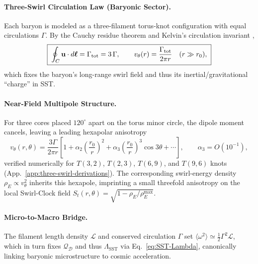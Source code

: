 \documentclass[10pt,reprint,aps,onecolumn,nofootinbib]{revtex4-2}
\begin{document}
    \paragraph{Three-Swirl Circulation Law (Baryonic Sector).}
        Each baryon is modeled as a three-filament torus-knot configuration with
        equal circulations $\Gamma$. By the Cauchy residue theorem and Kelvin’s circulation
        invariant \cite{Kelvin1869,Batchelor1967,Saffman1992},
        \begin{equation}
        \boxed{\;
        \oint_{C} \mathbf{u}\cdot d\boldsymbol{\ell} =
            \Gamma_{\rm tot} = 3\,\Gamma,
            \qquad
            v_\theta(r)=\frac{\Gamma_{\rm tot}}{2\pi r}\quad(r\gg r_0),
            \;}
        \label{eq:three-swirl-circulation}
        \end{equation}
        which fixes the baryon’s long-range swirl field and thus its inertial/gravitational
        ``charge'' in SST.

    \paragraph{Near-Field Multipole Structure.}
        For three cores placed $120^\circ$ apart on the torus minor circle, the dipole
        moment cancels, leaving a leading hexapolar anisotropy
        \begin{equation}
        \boxed{\;
        v_\theta(r,\theta)=\frac{3\Gamma}{2\pi r}\!\left[
                                                       1+\alpha_2\!\left(\frac{r_0}{r}\right)^{2}
                                                       +\alpha_3\!\left(\frac{r_0}{r}\right)^{3}\cos 3\theta+\cdots
        \right],
            \qquad
            \alpha_3=O(10^{-1}),
            \;}
        \label{eq:hexapole-expansion}
        \end{equation}
        verified numerically for $T(3,2)$, $T(2,3)$, $T(6,9)$, and $T(9,6)$ knots
        (App.~\ref{app:three-swirl-derivations}).
        The corresponding swirl-energy density $\rho_{\!E}\propto v_\theta^2$ inherits this
        hexapole, imprinting a small threefold anisotropy on the local Swirl-Clock field
        $S_t(r,\theta)=\sqrt{1-\rho_{\!E}/\rho_{\!E}^{\max}}$.

    \paragraph{Micro-to-Macro Bridge.}
        The filament length density $\mathcal{L}$ and conserved circulation $\Gamma$
        set $\langle\omega^2\rangle\simeq \tfrac12\Gamma^2\mathcal{L}$, which in turn fixes
        $\mathcal{Q}_\mathcal{D}$ and thus $\Lambda_{\!\mathrm{SST}}$ via
        Eq.~\eqref{eq:SST-Lambda}, canonically linking baryonic microstructure to cosmic
        acceleration.
\end{document}
